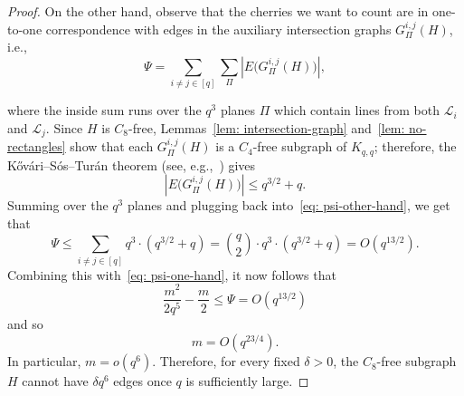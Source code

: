 \documentclass[A4paper,reqno,oneside,11pt]{amsart}
\theoremstyle{plain}
\theoremstyle{definition}
\newcommand{\scL}{\mathscr{L}}
\newcommand{\F}{\mathbb{F}}
\def\d{\delta}
\begin{document}
\begin{proof}
    On the other hand, observe that the cherries we want to count are in one-to-one correspondence with edges in the auxiliary intersection graphs $G_\Pi^{i,j}(H)$, i.e., 
    \begin{equation}
    \label{eq: psi-other-hand}
        \Psi = \sum_{i \neq j \in [q]} \sum_\Pi |E\bigl(G_\Pi^{i,j}(H)\bigr)|,
    \end{equation}

    where the inside sum runs over the $q^3$ planes $\Pi$ which contain lines from both $\scL_i$ and $\scL_j$.
    Since $H$ is $C_8$-free, Lemmas~\ref{lem: intersection-graph} and~\ref{lem: no-rectangles}
    show that each $G_\Pi^{i,j}(H)$ is a $C_4$-free subgraph of $K_{q,q}$; therefore, the K\H{o}v\'ari--S\'os--Tur\'an theorem (see, e.g.,~\cite[Theorem VI.2.2]{Bollobas}) gives
    \begin{equation*}
        |E\bigl(G_\Pi^{i,j}(H)\bigr)| \leq q^{3/2}+q.
    \end{equation*}
    Summing over the $q^3$ planes and plugging back into~\eqref{eq: psi-other-hand}, we get that
    \begin{equation*}
        \Psi 
        \leq \sum_{i \neq j \in [q]} q^3 \cdot (q^{3/2}+q)
        = \binom{q}{2} \cdot q^3 \cdot (q^{3/2}+q)
        =O(q^{13/2}).
    \end{equation*}
    Combining this with~\eqref{eq: psi-one-hand}, it now follows that
    \begin{equation*}
        \frac{m^2}{2q^5}-\frac{m}{2} \leq \Psi =O(q^{13/2})
    \end{equation*}
    and so
    \begin{equation*}
        m=O(q^{23/4}).
    \end{equation*}
    In particular, $m=o(q^6)$. 
    Therefore, for every fixed $\d > 0$, the $C_8$-free subgraph $H$
    cannot have $\d q^6$ edges once $q$ is sufficiently large. 
\end{proof}
\end{document}
